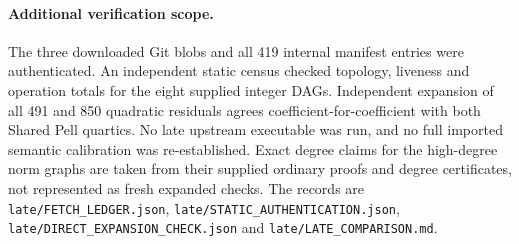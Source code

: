 \paragraph{Additional verification scope.}
The three downloaded Git blobs and all 419 internal manifest entries
were authenticated.  An independent static census checked topology,
liveness and operation totals for the eight supplied integer DAGs.
Independent expansion of all 491 and 850 quadratic residuals agrees
coefficient-for-coefficient with both Shared Pell quartics.
No late upstream executable was run, and no full imported semantic
calibration was re-established.  Exact degree claims for the
high-degree norm graphs are taken from their supplied ordinary proofs
and degree certificates, not represented as fresh expanded checks.
The records are \texttt{late/FETCH\_LEDGER.json},
\texttt{late/STATIC\_AUTHENTICATION.json},
\texttt{late/DIRECT\_EXPANSION\_CHECK.json} and
\texttt{late/LATE\_COMPARISON.md}.
